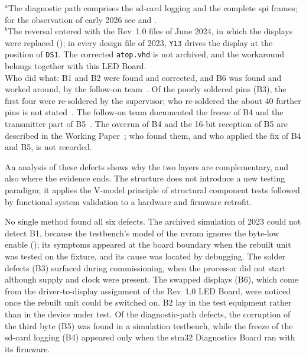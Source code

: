\begin{table}[htbp]
	\medskip
	\begin{minipage}{0.9\textwidth}
		\footnotesize
		$^{a}$The diagnostic path comprises the \gls{sd}-card logging and the complete \gls{spi} frames; for the observation of early 2026 see  and .\\
		$^{b}$The reversal entered with the Rev~1.0 files of June 2024, in which the displays were replaced (); in every design file of 2023, \texttt{Y13} drives the display at the position of \texttt{DS1}. The corrected \texttt{atop.vhd} is not archived, and the workaround belongs together with this LED Board.\\
		Who did what: B1 and B2 were found and corrected, and B6 was found and worked around, by the follow-on team~\cite[pp.~10--14]{savchuk2025}. Of the poorly soldered pins (B3), the first four were re-soldered by the supervisor; who re-soldered the about 40 further pins is not stated~\cite[p.~13]{savchuk2025}. The follow-on team documented the freeze of B4 and the transmitter part of B5~\cite[pp.~19, 21]{savchuk2025}. The overrun of B4 and the 16-bit reception of B5 are described in the Working Paper~\cite[Sec.~V-E]{torun2026}; who found them, and who applied the fix of B4 and B5, is not recorded.
	\end{minipage}
\end{table}

An analysis of these defects shows why the two layers are complementary, and also where the evidence ends. The structure does not introduce a new testing paradigm; it applies the V-model principle of structural component tests followed by functional system validation to a hardware and firmware retrofit.

No single method found all six defects. The archived simulation of 2023 could not detect B1, because the testbench's model of the \gls{nvram} ignores the byte-low enable (); its symptoms appeared at the board boundary when the rebuilt unit was tested on the fixture, and its cause was located by debugging. The solder defects (B3) surfaced during commissioning, when the processor did not start although supply and clock were present. The swapped displays (B6), which come from the driver-to-display assignment of the Rev~1.0 LED Board, were noticed once the rebuilt unit could be switched on. B2 lay in the test equipment rather than in the device under test. Of the diagnostic-path defects, the corruption of the third byte (B5) was found in a simulation testbench, while the freeze of the \gls{sd}-card logging (B4) appeared only when the \gls{stm32} Diagnostics Board ran with its firmware.

